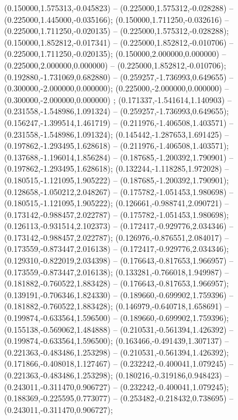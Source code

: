  (0.150000,1.575313,-0.045823) -- (0.225000,1.575312,-0.028288) -- (0.225000,1.445000,-0.035166);
 (0.150000,1.711250,-0.032616) -- (0.225000,1.711250,-0.020135) -- (0.225000,1.575312,-0.028288);
 (0.150000,1.852812,-0.017341) -- (0.225000,1.852812,-0.010706) -- (0.225000,1.711250,-0.020135);
 (0.150000,2.000000,0.000000) -- (0.225000,2.000000,0.000000) -- (0.225000,1.852812,-0.010706);
 (0.192880,-1.731069,0.682880) -- (0.259257,-1.736993,0.649655) -- (0.300000,-2.000000,0.000000);
 (0.225000,-2.000000,0.000000) -- (0.300000,-2.000000,0.000000) ;
 (0.171337,-1.541614,1.140903) -- (0.231558,-1.548986,1.091324) -- (0.259257,-1.736993,0.649655);
 (0.156247,-1.399514,1.461719) -- (0.211976,-1.406508,1.403571) -- (0.231558,-1.548986,1.091324);
 (0.145442,-1.287653,1.691425) -- (0.197862,-1.293495,1.628618) -- (0.211976,-1.406508,1.403571);
 (0.137688,-1.196014,1.856284) -- (0.187685,-1.200392,1.790901) -- (0.197862,-1.293495,1.628618);
 (0.132244,-1.118285,1.972028) -- (0.180515,-1.121095,1.905222) -- (0.187685,-1.200392,1.790901);
 (0.128658,-1.050212,2.048267) -- (0.175782,-1.051453,1.980698) -- (0.180515,-1.121095,1.905222);
 (0.126661,-0.988741,2.090721) -- (0.173142,-0.988457,2.022787) -- (0.175782,-1.051453,1.980698);
 (0.126113,-0.931514,2.102373) -- (0.172417,-0.929776,2.034346) -- (0.173142,-0.988457,2.022787);
 (0.126976,-0.876551,2.084017) -- (0.173559,-0.873447,2.016138) -- (0.172417,-0.929776,2.034346);
 (0.129310,-0.822019,2.034398) -- (0.176643,-0.817653,1.966957) -- (0.173559,-0.873447,2.016138);
 (0.133281,-0.766018,1.949987) -- (0.181882,-0.760522,1.883428) -- (0.176643,-0.817653,1.966957);
 (0.139191,-0.706346,1.824330) -- (0.189660,-0.699902,1.759396) -- (0.181882,-0.760522,1.883428);
 (0.146979,-0.640718,1.658691) -- (0.199874,-0.633564,1.596500) -- (0.189660,-0.699902,1.759396);
 (0.155138,-0.569062,1.484888) -- (0.210531,-0.561394,1.426392) -- (0.199874,-0.633564,1.596500);
 (0.163466,-0.491439,1.307137) -- (0.221363,-0.483486,1.253298) -- (0.210531,-0.561394,1.426392);
 (0.171866,-0.408018,1.127467) -- (0.232242,-0.400041,1.079245) -- (0.221363,-0.483486,1.253298);
 (0.180216,-0.319186,0.948423) -- (0.243011,-0.311470,0.906727) -- (0.232242,-0.400041,1.079245);
 (0.188369,-0.225595,0.773077) -- (0.253482,-0.218432,0.738695) -- (0.243011,-0.311470,0.906727);
